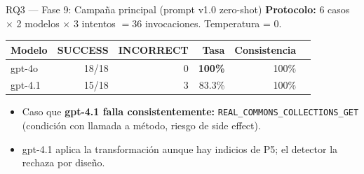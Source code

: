 \documentclass[aspectratio=169, 10pt]{beamer}
\newcommand{\ok}[1]{\textcolor{okgreen}{\textbf{#1}}}
\newcommand{\warn}[1]{\textcolor{warnred}{\textbf{#1}}}
\begin{document}
\begin{frame}{RQ3 --- Fase 9: Campaña principal (prompt v1.0 zero-shot)}
  \textbf{Protocolo:} 6 casos $\times$ 2 modelos $\times$ 3 intentos
  $= 36$ invocaciones. Temperatura = 0.

  \vspace{0.5em}
  \begin{table}
    \centering
    \footnotesize
    \begin{tabular}{lrrrrr}
      \toprule
      \textbf{Modelo} & \textbf{SUCCESS} & \textbf{INCORRECT} &
        \textbf{Tasa} & \textbf{Consistencia} \\
      \midrule
      gpt-4o  & 18/18 & 0 & \ok{100\%} & 100\% \\
      gpt-4.1 & 15/18 & 3 & 83.3\%     & 100\% \\
      \bottomrule
    \end{tabular}
  \end{table}

  \vspace{0.4em}
  \begin{itemize}
    \item Caso que \warn{gpt-4.1 falla consistentemente:}
          \texttt{REAL\_COMMONS\_COLLECTIONS\_GET}
          (condición con llamada a método, riesgo de side effect).
    \item gpt-4.1 aplica la transformación aunque hay indicios de P5;
          el detector la rechaza por diseño.
  \end{itemize}
\end{frame}
\end{document}

